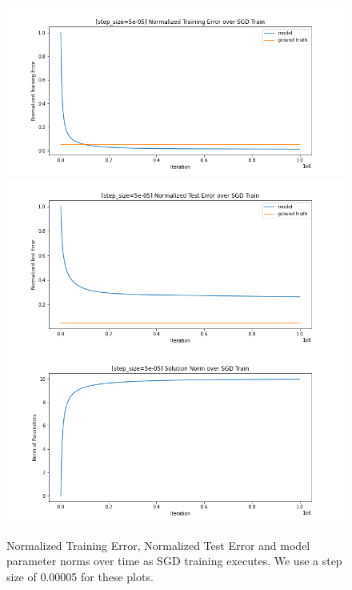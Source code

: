 \documentclass[12pt]{article}
\begin{document}
\begin{enumerate}[label=(\alph*)]
    \begin{figure}[!ht]
      \centering
      \includegraphics[scale=0.5]{figures/training_error_for_iter_small.png}
      \includegraphics[scale=0.5]{figures/test_error_for_iter_small.png}
      \includegraphics[scale=0.5]{figures/solution_norms_for_iter_small.png}
      \caption{Normalized Training Error, Normalized Test Error and model parameter norms over time as SGD training executes. We use a step size of 0.00005 for these plots.}
      \label{fig:sgd_iter_small}
    \end{figure}


\end{enumerate}
\end{document}
